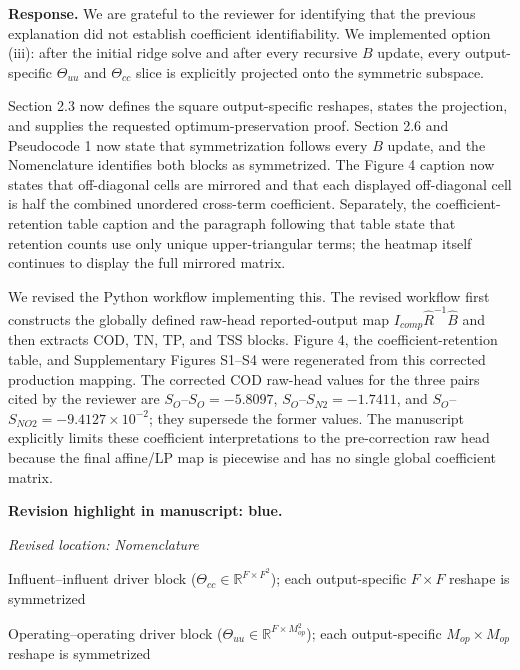 \documentclass[11pt,a4paper]{article}
\newcommand{\revisionnotice}{\par\noindent\textcolor{revisionblue}{\textbf{Revision highlight in manuscript: blue.}}\par}
\newcommand{\excerptlocation}[1]{\par\noindent\textit{Revised location: #1}\par}
\begin{document}
\noindent\textbf{Response.} We are grateful to the reviewer for identifying that the previous explanation did not establish coefficient identifiability. We implemented option (iii): after the initial ridge solve and after every recursive $B$ update, every output-specific $\Theta_{uu}$ and $\Theta_{cc}$ slice is explicitly projected onto the symmetric subspace.

Section 2.3 now defines the square output-specific reshapes, states the projection, and supplies the requested optimum-preservation proof. Section 2.6 and Pseudocode 1 now state that symmetrization follows every $B$ update, and the Nomenclature identifies both blocks as symmetrized. The Figure 4 caption now states that off-diagonal cells are mirrored and that each displayed off-diagonal cell is half the combined unordered cross-term coefficient. Separately, the coefficient-retention table caption and the paragraph following that table state that retention counts use only unique upper-triangular terms; the heatmap itself continues to display the full mirrored matrix.

We revised the Python workflow implementing this. The revised workflow first constructs the globally defined raw-head reported-output map $I_{comp}\widehat{R}^{-1}\widehat{B}$ and then extracts COD, TN, TP, and TSS blocks. Figure 4, the coefficient-retention table, and Supplementary Figures S1--S4 were regenerated from this corrected production mapping. The corrected COD raw-head values for the three pairs cited by the reviewer are $S_O$--$S_O=-5.8097$, $S_O$--$S_{N2}=-1.7411$, and $S_O$--$S_{NO2}=-9.4127\times10^{-2}$; they supersede the former values. The manuscript explicitly limits these coefficient interpretations to the pre-correction raw head because the final affine/LP map is piecewise and has no single global coefficient matrix.

\revisionnotice

\excerptlocation{Nomenclature}
\begin{revisionexcerpt}
Influent--influent driver block ($\Theta_{cc} \in \mathbb{R}^{F \times F^2}$); each output-specific $F \times F$ reshape is symmetrized

Operating--operating driver block ($\Theta_{uu} \in \mathbb{R}^{F \times M_{op}^2}$); each output-specific $M_{op} \times M_{op}$ reshape is symmetrized
\end{revisionexcerpt}
\end{document}

